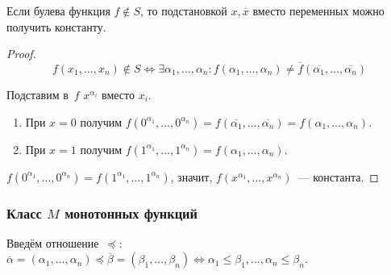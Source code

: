 \begin{lemma}
Если булева функция $f \notin S$, то подстановкой $x, \overline x$ вместо переменных можно получить константу.
\end{lemma}
\begin{proof}
\begin{equation*}
f(x_1, \ldots, x_n) \notin S \Leftrightarrow
\exists \alpha_1, \ldots, \alpha_n \colon
f(\alpha_1, \ldots, \alpha_n) \neq \overline f(\overline{\alpha_1}, \ldots, \overline{\alpha_n})
\end{equation*}

Подставим в~$f$ $x^{\alpha_i}$ вместо $x_i$.
\begin{enumerate}
	\item При $x = 0$ получим $f(0^{\alpha_1}, \ldots, 0^{\alpha_n}) =
	f(\overline{\alpha_1}, \ldots, \overline{\alpha_n}) =
	f(\alpha_1, \ldots, \alpha_n)$.
	
	\item При $x = 1$ получим $f(1^{\alpha_1}, \ldots, 1^{\alpha_n}) =
	f(\alpha_1, \ldots, \alpha_n)$.
\end{enumerate}

$f(0^{\alpha_1}, \ldots, 0^{\alpha_n}) = f(1^{\alpha_1}, \ldots, 1^{\alpha_n})$, значит, $f(x^{\alpha_1}, \ldots, x^{\alpha_n})$~--- константа.
\end{proof}

\subsubsection{Класс \texorpdfstring{$M$}{} монотонных функций}
Введём отношение~$\preccurlyeq$: $\overline\alpha = (\alpha_1, \ldots, \alpha_n) \preccurlyeq \overline\beta = (\beta_1, \ldots, \beta_n) \Leftrightarrow
\alpha_1 \leqslant \beta_1, \ldots, \alpha_n \leqslant \beta_n$.

